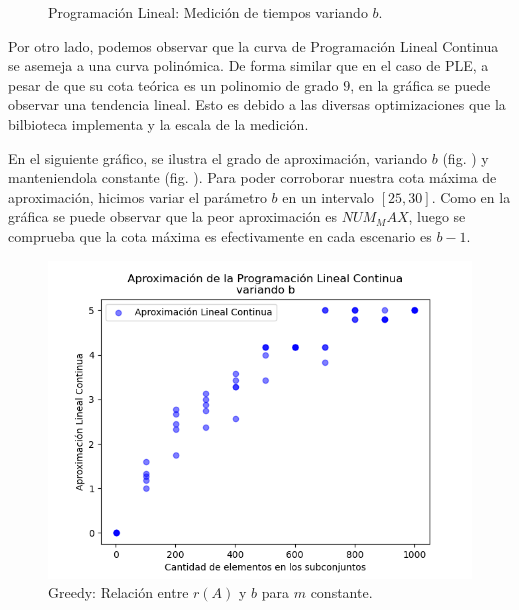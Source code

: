 \begin{figure}[h]
\begin{minipage}{0.45\textwidth}
        \caption{Programación Lineal: Medición de tiempos variando $b$.}
        \label{fig:medicion_t_pl_var_b}
    \end{minipage}
\end{figure}

Por otro lado, podemos observar que la curva de Programación Lineal Continua se asemeja a una curva polinómica. De forma similar que en el caso de PLE, a pesar de que su cota teórica es un polinomio de grado $9$, en la gráfica se puede observar una tendencia lineal. Esto es debido a las diversas optimizaciones que la bilbioteca implementa y la escala de la medición.

En el siguiente gráfico, se ilustra el grado de aproximación, variando $b$ (fig. \label{medicion-plc-var-b}) y manteniendola constante (fig. \label{medicion-plc-cons-b}). Para poder corroborar nuestra cota máxima de aproximación, hicimos variar el parámetro $b$ en un intervalo $\left[25,30\right]$. Como en la gráfica se puede observar que la peor aproximación es $NUM_MAX$, luego se comprueba que la cota máxima es efectivamente en cada escenario es $b-1$.

\begin{figure}[h]
    \centering
    \begin{minipage}{0.45\textwidth}
        \centering
        \includegraphics[width=\textwidth]{img/medicion_r_pl_var_b.png}
        \caption{Greedy: Relación entre $r(A)$ y $b$ para $m$ constante.}
        \label{fig:medicion_r_pl_var_b}
    \end{minipage}
\end{figure}

